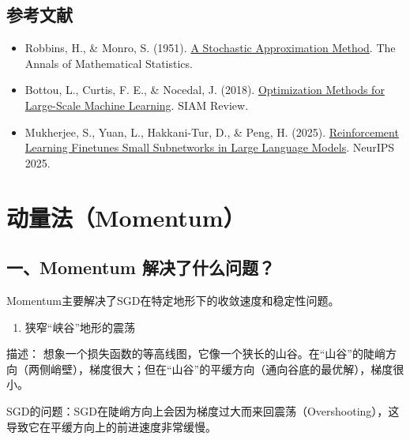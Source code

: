 \hypertarget{ux53c2ux8003ux6587ux732e-25}{%
\subsection{参考文献}\label{ux53c2ux8003ux6587ux732e-25}}

\vspace{0.25em}
\begin{itemize}
\tightlist
\item
  Robbins, H., \& Monro, S. (1951). \href{https://doi.org/10.1214/aoms/1177729586}{A Stochastic Approximation Method}. The Annals of Mathematical Statistics.
\item
  Bottou, L., Curtis, F. E., \& Nocedal, J. (2018). \href{https://epubs.siam.org/doi/10.1137/16M1080173}{Optimization Methods for Large-Scale Machine Learning}. SIAM Review.
\item
  Mukherjee, S., Yuan, L., Hakkani-Tur, D., \& Peng, H. (2025). \href{https://arxiv.org/abs/2505.11711}{Reinforcement Learning Finetunes Small Subnetworks in Large Language Models}. NeurIPS 2025.
\end{itemize}

\clearpage

\hypertarget{ux52a8ux91cfux6cd5momentum}{%
\section{动量法（Momentum）}\label{ux52a8ux91cfux6cd5momentum}}

\hypertarget{ux4e00momentum-ux89e3ux51b3ux4e86ux4ec0ux4e48ux95eeux9898}{%
\subsection{一、Momentum 解决了什么问题？}\label{ux4e00momentum-ux89e3ux51b3ux4e86ux4ec0ux4e48ux95eeux9898}}

Momentum主要解决了SGD在特定地形下的收敛速度和稳定性问题。

\begin{enumerate}
\def\labelenumi{\arabic{enumi}.}
\tightlist
\item
  狭窄``峡谷''地形的震荡
\end{enumerate}

描述： 想象一个损失函数的等高线图，它像一个狭长的山谷。在``山谷''的陡峭方向（两侧峭壁），梯度很大；但在``山谷''的平缓方向（通向谷底的最优解），梯度很小。

SGD的问题：SGD在陡峭方向上会因为梯度过大而来回震荡（Overshooting），这导致它在平缓方向上的前进速度非常缓慢。

